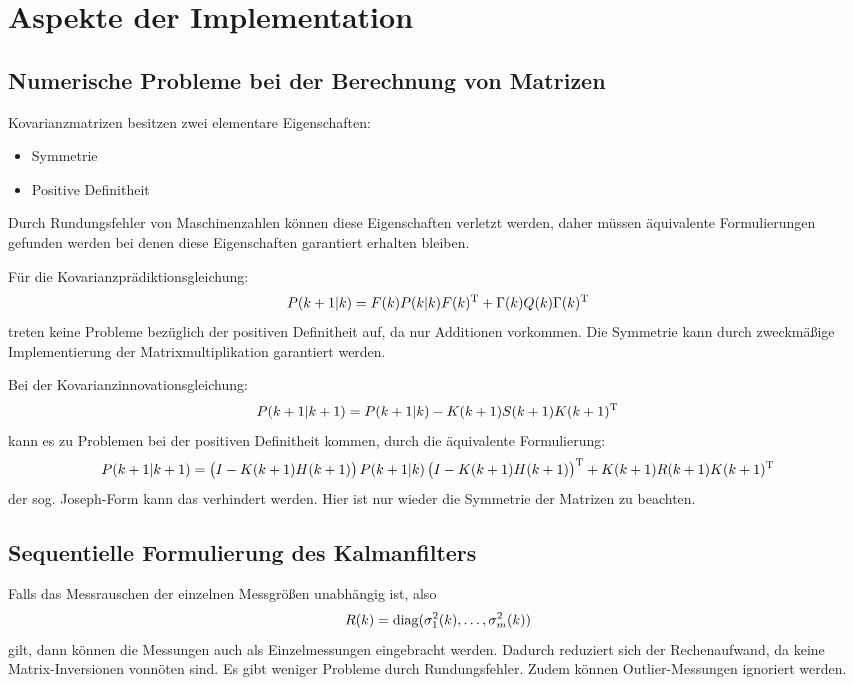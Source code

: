 \chapter{Aspekte der Implementation}
\section{Numerische Probleme bei der Berechnung von Matrizen}
Kovarianzmatrizen besitzen zwei elementare Eigenschaften:
\begin{itemize}
    \item Symmetrie
    \item Positive Definitheit
\end{itemize}
Durch Rundungsfehler von Maschinenzahlen können diese Eigenschaften verletzt werden, daher müssen
äquivalente Formulierungen gefunden werden bei denen diese Eigenschaften garantiert erhalten bleiben.

Für die Kovarianzprädiktionsgleichung:
\begin{equation*}
    P(k+1|k) = F(k) P(k|k) F(k)^\text{T} + \Gamma(k) Q(k) \Gamma(k)^\text{T}
\end{equation*}
treten keine Probleme bezüglich der positiven Definitheit auf, da nur Additionen vorkommen. 
Die Symmetrie kann durch zweckmäßige Implementierung der Matrixmultiplikation garantiert werden.

Bei der Kovarianzinnovationsgleichung:
\begin{equation*}
    P(k+1|k+1) = P(k+1|k) - K(k+1) S(k+1) K(k+1)^\text{T}
\end{equation*}
kann es zu Problemen bei der positiven Definitheit kommen, durch die äquivalente Formulierung:
\begin{equation*}
    P(k+1|k+1) = \left(I-K(k+1)H(k+1)\right) P(k+1|k) \left(I-K(k+1)H(k+1)\right)^\text{T} + K(k+1) R(k+1) K(k+1)^\text{T}
\end{equation*}
der sog. Joseph-Form kann das verhindert werden. Hier ist nur wieder die Symmetrie der Matrizen zu beachten.

\section{Sequentielle Formulierung des Kalmanfilters}
Falls das Messrauschen der einzelnen Messgrößen unabhängig ist, also
\begin{equation*}
    R(k) = \operatorname*{diag}(\sigma_1^2(k), \ldots, \sigma_m^2(k))
\end{equation*}
gilt, dann können die Messungen auch als Einzelmessungen eingebracht werden. Dadurch reduziert sich der Rechenaufwand,
da keine Matrix-Inversionen vonnöten sind. Es gibt weniger Probleme durch Rundungsfehler. 
Zudem können Outlier-Messungen ignoriert werden.

